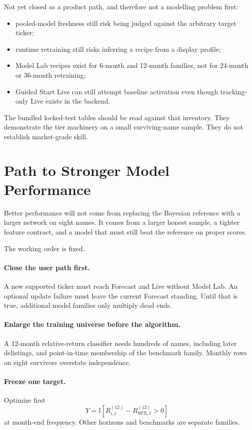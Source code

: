 \documentclass[11pt]{article}
\newcommand{\I}{\mathbb{I}}
\begin{document}
Not yet closed as a product path, and therefore not a modelling problem first:
\begin{itemize}[itemsep=0.15em]
\item pooled-model freshness still risk being judged against the arbitrary target ticker;
\item runtime retraining still risks inferring a recipe from a display profile;
\item Model Lab recipes exist for 6-month and 12-month families, not for 24-month or 36-month retraining;
\item Guided Start Live can still attempt baseline activation even though tracking-only Live exists in the backend.
\end{itemize}

The bundled locked-test tables should be read against that inventory. They demonstrate the tier machinery on a small surviving-name sample. They do not establish market-grade skill.

\section{Path to Stronger Model Performance}
Better performance will not come from replacing the Bayesian reference with a larger network on eight names. It comes from a larger honest sample, a tighter feature contract, and a model that must still beat the reference on proper scores.

The working order is fixed.

\paragraph{Close the user path first.}
A new supported ticker must reach Forecast and Live without Model Lab. An optional update failure must leave the current Forecast standing. Until that is true, additional model families only multiply dead ends.

\paragraph{Enlarge the training universe before the algorithm.}
A 12-month relative-return classifier needs hundreds of names, including later delistings, and point-in-time membership of the benchmark family. Monthly rows on eight survivors overstate independence.

\paragraph{Freeze one target.}
Optimize first
\[
Y=\I\!\left[R_{i,t}^{(12)}-R_{\mathrm{SPX},t}^{(12)}>0\right]
\]
at month-end frequency. Other horizons and benchmarks are separate families.
\end{document}
